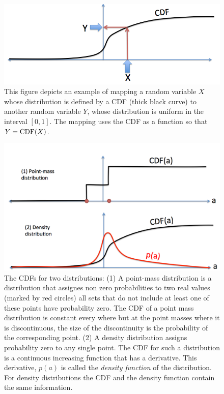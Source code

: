 \begin{figure}[th]
\begin{center}
\includegraphics[width=5in]{figs/CDFmapping.png}
\end{center}
\caption{This figure depicts an example of mapping a random variable
  $X$ whose distribution is defined by a CDF (thick black curve) to
  another random variable $Y$, whose distribution is uniform in the
  interval $[0,1]$. The mapping uses the CDF as a function so that
  $Y=\mbox{CDF}(X)$. \label{fig:CDFmap}}
\end{figure}

\begin{figure}[h]
\begin{center}
\includegraphics[width=5in]{figs/CDFs.png}
\end{center}
\caption{The CDFs for two distributions: (1) A point-mass distribution
  is a distribution that assignes non zero probabilities to two real
  values (marked by red circles) all sets that do not include at least
  one of these points have probability zero. The CDF of a point mass
  distribution is constant every where but at the point masses where
  it is discontinuous, the size of the discontinuity is the
  probability of the corresponding point. (2) A density distribution
  assigns probability zero to any single point. The CDF for such a
  distribution is a continuous increasing function that has a
  derivative. This derivative, $p(a)$ is called the {\em density function} of
  the distribution. For density distributions the CDF and the density
  function contain the same information.\label{fig:CDF}}
\end{figure}

